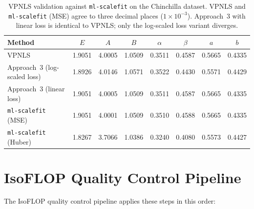 \documentclass[11pt]{article}
\begin{document}
\begin{table}[H]
    \centering
    \small
    \begin{tabular}{lccccccc}
        \toprule
        Method & $E$ & $A$ & $B$ & $\alpha$ & $\beta$ & $a$ & $b$ \\
        \midrule
        VPNLS & 1.9051 & 4.0005 & 1.0509 & 0.3511 & 0.4587 & 0.5665 & 0.4335 \\
        Approach~3 (log-scaled loss) & 1.8926 & 4.0146 & 1.0571 & 0.3522 & 0.4430 & 0.5571 & 0.4429 \\
        Approach~3 (linear loss) & 1.9051 & 4.0005 & 1.0509 & 0.3511 & 0.4587 & 0.5665 & 0.4335 \\
        \midrule
        \texttt{ml-scalefit} (MSE) & 1.9051 & 4.0001 & 1.0509 & 0.3510 & 0.4588 & 0.5665 & 0.4335 \\
        \texttt{ml-scalefit} (Huber) & 1.8267 & 3.7066 & 1.0386 & 0.3240 & 0.4080 & 0.5573 & 0.4427 \\
        \bottomrule
    \end{tabular}
    \caption{VPNLS validation against \texttt{ml-scalefit} on the Chinchilla
    dataset. VPNLS and \texttt{ml-scalefit} (MSE) agree to three decimal places ($1 \times 10^{-3}$).
    Approach~3 with linear loss is identical to VPNLS; only the log-scaled loss
    variant diverges.}
    \label{tab:vpnls_validation}
\end{table}

\section{IsoFLOP Quality Control Pipeline}
\label{sec:appendix_isoflop_qc}

The IsoFLOP quality control pipeline applies these steps in this order:
\end{document}
